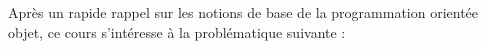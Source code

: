

Après un rapide rappel sur les notions de base de la programmation orientée objet, ce cours s'intéresse à la problématique suivante :  
